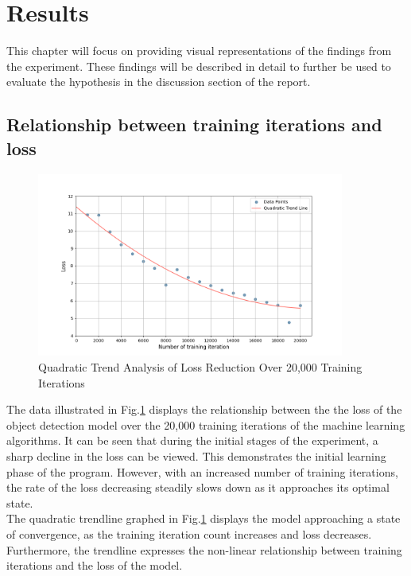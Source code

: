 

\section{Results}
This chapter will focus on providing visual representations of the findings from the experiment. These findings will be described in detail to further be used to evaluate the hypothesis in the discussion section of the report. 


\subsection{Relationship between training iterations and loss}
\begin{figure}[h]
   \centering
   \includegraphics[width=0.9\textwidth]{../Data/loss_by_iteration_plot.png}
   \caption{Quadratic Trend Analysis of Loss Reduction Over 20,000 Training Iterations}
   \label{fig:loss-vs-training-iterations}
\end{figure}
The data illustrated in Fig.\ref{fig:loss-vs-training-iterations} displays the relationship between the the loss of the object detection model over the 20,000 training iterations of the machine learning algorithms. It can be seen that during the initial stages of the experiment, a sharp decline in the loss can be viewed. This demonstrates the initial learning phase of the program. However, with an increased number of training iterations, the rate of the loss decreasing steadily slows down as it approaches its optimal state. \\

The quadratic trendline graphed in Fig.\ref{fig:loss-vs-training-iterations}  displays the model approaching a state of convergence, as the training iteration count increases and loss decreases. Furthermore, the trendline expresses the non-linear relationship between training iterations and the loss of the model. \\


